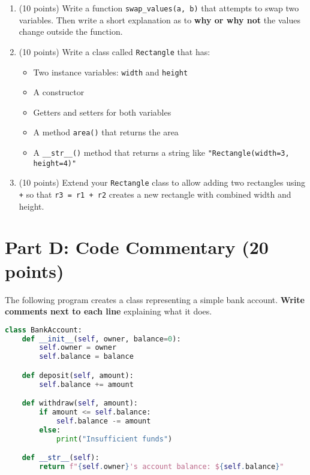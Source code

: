 \documentclass[11pt]{article}
\begin{document}
\begin{enumerate}[label=\arabic*.]
    \item (10 points) Write a function \verb|swap_values(a, b)| that attempts to swap two variables. Then write a short explanation as to \textbf{why or why not} the values change outside the function.
    
    \vspace{10cm}

    \item (10 points) Write a class called \verb|Rectangle| that has:
    \begin{itemize}
        \item Two instance variables: \verb|width| and \verb|height|
        \item A constructor
        \item Getters and setters for both variables
        \item A method \verb|area()| that returns the area
        \item A \verb|__str__()| method that returns a string like \verb|"Rectangle(width=3, height=4)"|
    \end{itemize}
    
    \vspace{6cm}
    
    \newpage

    \item (10 points) Extend your \verb|Rectangle| class to allow adding two rectangles using \verb|+| so that \verb|r3 = r1 + r2| creates a new rectangle with combined width and height.

    \vspace{10cm}
\end{enumerate}

\section*{Part D: Code Commentary (20 points)}  
The following program creates a class representing a simple bank account. \textbf{Write comments next to each line} explaining what it does.

\begin{lstlisting}[language=Python]
class BankAccount:
    def __init__(self, owner, balance=0):
        self.owner = owner
        self.balance = balance

    def deposit(self, amount):
        self.balance += amount

    def withdraw(self, amount):
        if amount <= self.balance:
            self.balance -= amount
        else:
            print("Insufficient funds")

    def __str__(self):
        return f"{self.owner}'s account balance: ${self.balance}"
\end{lstlisting}
\end{document}
